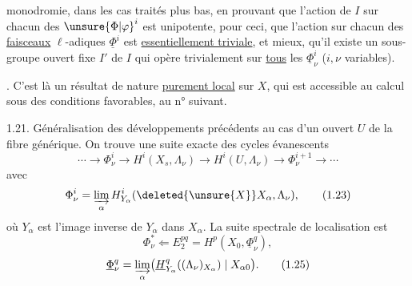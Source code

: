 monodromie, dans les cas  traités plus bas, en prouvant que l'action de $I$ sur chacun des ${\unsure{\Phi|\varphi}}^i$ est  unipotente,  pour ceci, que  l'action sur chacun des \uline{faisceaux} $\ell$-adiques $\underline\Phi^i$ est  \uline{essentiellement triviale}, et mieux, qu'il existe un sous-groupe  ouvert fixe $I'$ de $I$ qui opère trivialement sur \uline{tous} les \deleted{$\unsure{\Phi}$} $\underline\Phi^i_\nu$ ($i,\nu$ variables).

. C'est là un résultat de nature \uline{purement local} sur $X$, qui est accessible au calcul sous des conditions favorables,  au n° suivant.

1.21. Généralisation des développements précédents au cas d'un ouvert $U$ de la fibre générique.  On trouve une suite exacte des cycles évanescents
\[
\cdots\longrightarrow\Phi^i_\nu\longrightarrow H^i(X_s,\Lambda_\nu)\longrightarrow H^i(U,\Lambda_\nu)\longrightarrow\Phi^{i+1}_\nu\longrightarrow\cdots
\tag*{(1.22)}
\]
avec
\[
\Phi^i_\nu=\varinjlim_\alpha H^i_{Y_\alpha}(\deleted{\unsure{X}}X_\alpha,\Lambda_\nu),
\tag*{(1.23)}
\]
où $Y_\alpha$ est l'image inverse de $Y_\alpha$ dans $X_\alpha$. La suite spectrale de localisation est
\[
\Phi^*_\nu\Longleftarrow E_2^{pq}=H^p(X_0,\underline\Phi^q_\nu),
\tag*{(1.24).}
\]
\[
\underline\Phi^q_\nu=\varinjlim_\alpha\bigl(\underline H^q_{Y_\alpha}((\Lambda_\nu)_{X_\alpha})\mid X_{\alpha0}\bigr).
\tag*{(1.25)}
\]
